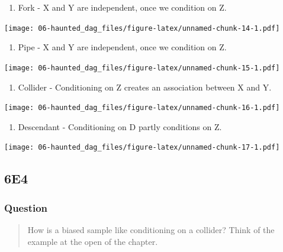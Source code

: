 \documentclass[
]{book}
\providecommand{\tightlist}{%
  \setlength{\itemsep}{0pt}\setlength{\parskip}{0pt}}
\begin{document}
\begin{enumerate}
\def\labelenumi{\arabic{enumi}.}
\tightlist
\item
  Fork - X and Y are independent, once we condition on Z.
\end{enumerate}

\texttt{[image: 06-haunted\_dag\_files/figure-latex/unnamed-chunk-14-1.pdf]}

\begin{enumerate}
\def\labelenumi{\arabic{enumi}.}
\setcounter{enumi}{1}
\tightlist
\item
  Pipe - X and Y are independent, once we condition on Z.
\end{enumerate}

\texttt{[image: 06-haunted\_dag\_files/figure-latex/unnamed-chunk-15-1.pdf]}

\begin{enumerate}
\def\labelenumi{\arabic{enumi}.}
\setcounter{enumi}{2}
\tightlist
\item
  Collider - Conditioning on Z creates an association between X and Y.
\end{enumerate}

\texttt{[image: 06-haunted\_dag\_files/figure-latex/unnamed-chunk-16-1.pdf]}

\begin{enumerate}
\def\labelenumi{\arabic{enumi}.}
\setcounter{enumi}{3}
\tightlist
\item
  Descendant - Conditioning on D partly conditions on Z.
\end{enumerate}

\texttt{[image: 06-haunted\_dag\_files/figure-latex/unnamed-chunk-17-1.pdf]}

\hypertarget{e4-4}{%
\subsection*{6E4}\label{e4-4}}

\hypertarget{question-51}{%
\subsubsection*{Question}\label{question-51}}

\begin{quote}
How is a biased sample like conditioning on a collider? Think of the example at the open of the chapter.
\end{quote}
\end{document}
